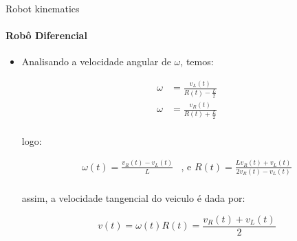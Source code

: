 \documentclass[aspectratio=169]{beamer}
\begin{document}
\begin{frame}{Robot kinematics}
    \framesubtitle{Robô Diferencial}
    \begin{itemize}
        \item Analisando a velocidade angular de $\omega$, temos:

              \begin{equation*}
                  \begin{split}
                      \omega & = \frac{v_L(t)}{R(t)-\frac{L}{2}} \\
                      \omega & = \frac{v_R(t)}{R(t)+\frac{L}{2}} \\
                  \end{split}
              \end{equation*}

              logo:

              \begin{equation*}
                  \begin{split}
                      \omega (t) = \frac{ v_R(t) - v_L(t)}{L} & \text{, e }
                      R(t)  = \frac{L v_R(t) + v_L(t)}{2 v_R(t) - v_L(t)} \\
                  \end{split}
              \end{equation*}

              assim, a velocidade tangencial do veiculo é dada por:

              \begin{equation}
                  v (t) =\omega (t) R(t) = \frac{ v_R(t) + v_L(t)}{2}
              \end{equation}
    \end{itemize}
\end{frame}
\end{document}
